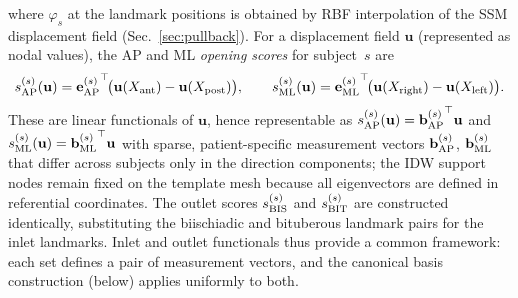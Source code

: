 \documentclass[11pt]{article}
\begin{document}
where $\varphi_s$ at the landmark positions is obtained by RBF interpolation of the SSM displacement field (Sec.~\ref{sec:pullback}).
For a displacement field $\mathbf u$ (represented as nodal values), the AP and ML \emph{opening scores} for subject~$s$ are
\begin{equation}\label{eq:inlet-scores}
s_{\rm AP}^{(s)}(\mathbf u) = {\mathbf e_{\rm AP}^{(s)}}^\top\!\big(\mathbf u(X_{\rm ant}) - \mathbf u(X_{\rm post})\big),
\qquad
s_{\rm ML}^{(s)}(\mathbf u) = {\mathbf e_{\rm ML}^{(s)}}^\top\!\big(\mathbf u(X_{\rm right}) - \mathbf u(X_{\rm left})\big).
\end{equation}
These are linear functionals of $\mathbf u$, hence representable as $s_{\rm AP}^{(s)}(\mathbf u)={\mathbf b_{\rm AP}^{(s)}}^\top \mathbf u$ and $s_{\rm ML}^{(s)}(\mathbf u)={\mathbf b_{\rm ML}^{(s)}}^\top \mathbf u$ with sparse, patient-specific measurement vectors $\mathbf b_{\rm AP}^{(s)}$, $\mathbf b_{\rm ML}^{(s)}$ that differ across subjects only in the direction components; the IDW support nodes remain fixed on the template mesh because all eigenvectors are defined in referential coordinates.
The outlet scores $s_{\rm BIS}^{(s)}$ and $s_{\rm BIT}^{(s)}$ are constructed identically, substituting the biischiadic and bituberous landmark pairs for the inlet landmarks.  Inlet and outlet functionals thus provide a common framework: each set defines a pair of measurement vectors, and the canonical basis construction (below) applies uniformly to both.
\end{document}
